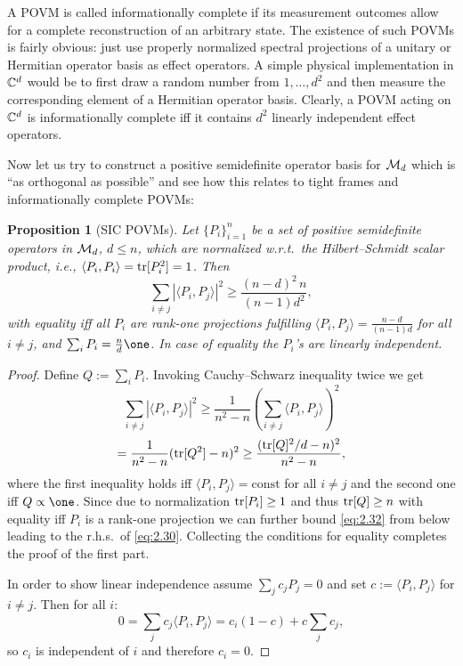 \documentclass[11pt,a4paper]{article}
\numberwithin{equation}{section}
\theoremstyle{plain}
\newtheorem{proposition}{Proposition}[section]
\theoremstyle{definition}
\begin{document}
A POVM is called informationally complete if its measurement outcomes allow for a
complete reconstruction of an arbitrary state. The existence of such POVMs is fairly
obvious: just use properly normalized spectral projections of a unitary or Hermitian
operator basis as effect operators. A simple physical implementation in $\mathbb{C}^d$
would be to first draw a random number from $1,\dots,d^2$ and then measure the
corresponding element of a Hermitian operator basis. Clearly, a POVM acting on
$\mathbb{C}^d$ is informationally complete iff it contains $d^2$ linearly independent
effect operators.

Now let us try to construct a positive semidefinite operator basis for $\mathcal{M}_d$ which
is ``as orthogonal as possible'' and see how this relates to tight frames and
informationally complete POVMs:

\begin{proposition}[SIC POVMs]
    Let $\{P_i\}_{i=1}^n$ be a set of positive semidefinite operators in $\mathcal{M}_d$,
    $d\le n$, which are normalized w.r.t.\ the Hilbert--Schmidt scalar product, i.e.,
    $\langle P_i,P_i\rangle=\operatorname{tr}[P_i^2]=1$. Then
    \begin{equation}\label{eq:2.30}
        \sum_{i\ne j} |\langle P_i,P_j\rangle|^2 \ge \frac{(n-d)^2\,n}{(n-1)d^2},
    \end{equation}
    with equality iff all $P_i$ are rank-one projections fulfilling
    $\langle P_i,P_j\rangle=\frac{n-d}{(n-1)d}$ for all $i\ne j$, and $\sum_i P_i = \frac{n}{d}\one$.
    In case of equality the $P_i$'s are linearly independent.
\end{proposition}

\begin{proof}
    Define $Q:=\sum_i P_i$. Invoking Cauchy--Schwarz inequality twice we get
    \begin{equation}\label{eq:2.31}
        \sum_{i\ne j} |\langle P_i,P_j\rangle|^2 \ge \frac{1}{n^2-n}\left(\sum_{i\ne j} \langle P_i,P_j\rangle\right)^2
    \end{equation}
    \begin{equation}\label{eq:2.32}
        = \frac{1}{n^2-n}(\operatorname{tr}[Q^2]-n)^2 \ge \frac{(\operatorname{tr}[Q]^2/d - n)^2}{n^2-n},
    \end{equation}
    where the first inequality holds iff $\langle P_i,P_j\rangle=\mathrm{const}$ for all
    $i\ne j$ and the second one iff $Q\propto \one$. Since due to normalization
    $\operatorname{tr}[P_i]\ge 1$ and thus $\operatorname{tr}[Q]\ge n$ with equality iff $P_i$ is a rank-one
    projection we can further bound \eqref{eq:2.32} from below leading to the r.h.s.\ of
    \eqref{eq:2.30}. Collecting the conditions for equality completes the proof of the
    first part.

    In order to show linear independence assume $\sum_j c_j P_j=0$ and set
    $c:=\langle P_i,P_j\rangle$ for $i\ne j$. Then for all $i$:
    \[
        0=\sum_j c_j \langle P_i,P_j\rangle = c_i(1-c) + c\sum_j c_j,
    \]
    so $c_i$ is independent of $i$ and therefore $c_i=0$.
\end{proof}
\end{document}
